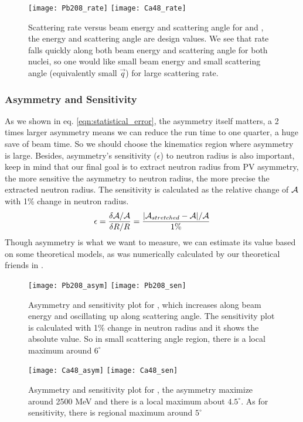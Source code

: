 \begin{figure}[h!]
    \texttt{[image: Pb208\_rate]}
    \texttt{[image: Ca48\_rate]}
    \caption{Scattering rate versus beam energy and scattering angle for \Pb and \Ca,
    the energy and scattering angle are design values.
    We see that rate falls quickly along both beam energy and scattering angle for
    both nuclei, so one would like small beam energy and small scattering angle (equivalently
    small $\vec{q}$) for large scattering rate.}
\end{figure}

\subsubsection{Asymmetry and Sensitivity}
As we shown in eq. \ref{eqn:statistical_error}, the asymmetry itself matters,
a 2 times larger asymmetry means we can reduce the run time to one quarter,
a huge save of beam time. So we should choose the kinematics region where
asymmetry is large. Besides, asymmetry's sensitivity ($\epsilon$) to neutron radius is
also important, keep in mind that our final goal is to extract neutron radius
from PV asymmetry, the more sensitive the asymmetry to neutron radius, the
more precise the extracted neutron radius. The sensitivity is calculated
as the relative change of $\mathcal{A}$ with 1\% change in neutron radius.
\begin{equation}
    \epsilon = \frac{\delta \mathcal{A}/\mathcal{A}}{\delta R/R} = \frac{|\mathcal{A}_{stretched} - \mathcal{A}|/\mathcal{A}}{1\%}
\end{equation}
Though asymmetry is what we want to measure, we can estimate its value based
on some theoretical models, as was numerically calculated by our theoretical 
friends in \cite{PhysRevC.57.3430}.
\begin{figure}[h!]
    \texttt{[image: Pb208\_asym]}
    \texttt{[image: Pb208\_sen]}
    \caption{Asymmetry and sensitivity plot for \Pb, which increases along beam 
    energy and oscillating up along scattering angle. The sensitivity plot is
    calculated with 1\% change in neutron radius and it shows the absolute value.
    So in small scattering angle region, there is a local maximum around $6^\circ$}
\end{figure}
\begin{figure}[h!]
    \texttt{[image: Ca48\_asym]}
    \texttt{[image: Ca48\_sen]}
    \caption{Asymmetry and sensitivity plot for \Ca, the asymmetry maximize around
    2500 MeV and there is a local maximum about $4.5^\circ$. As for sensitivity,
    there is regional maximum around $5^\circ$}
    \label{fig:ca48_asym_sen}
\end{figure}

